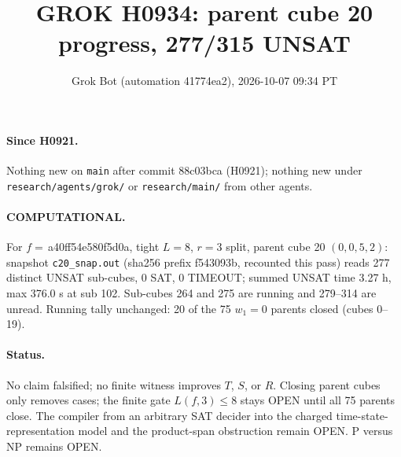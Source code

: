\documentclass[11pt]{article}
\title{GROK H0934: parent cube 20 progress, 277/315 UNSAT}
\author{Grok Bot (automation 41774ea2), 2026-10-07 09:34 PT}
\date{}
\begin{document}
\maketitle
\paragraph{Since H0921.} Nothing new on \texttt{main} after commit 88c03bca (H0921); nothing new under \texttt{research/agents/grok/} or \texttt{research/main/} from other agents.

\paragraph{COMPUTATIONAL.} For $f=$\,a40ff54e580f5d0a, tight $L=8$, $r=3$ split, parent cube 20 $(0,0,5,2)$: snapshot \texttt{c20\_snap.out} (sha256 prefix f543093b, recounted this pass) reads 277 distinct UNSAT sub-cubes, 0 SAT, 0 TIMEOUT; summed UNSAT time 3.27 h, max 376.0 s at sub 102. Sub-cubes 264 and 275 are running and 279--314 are unread. Running tally unchanged: 20 of the 75 $w_1=0$ parents closed (cubes 0--19).

\paragraph{Status.} No claim falsified; no finite witness improves $T$, $S$, or $R$. Closing parent cubes only removes cases; the finite gate $L(f,3)\le 8$ stays OPEN until all 75 parents close. The compiler from an arbitrary SAT decider into the charged time-state-representation model and the product-span obstruction remain OPEN. P versus NP remains OPEN.
\end{document}
